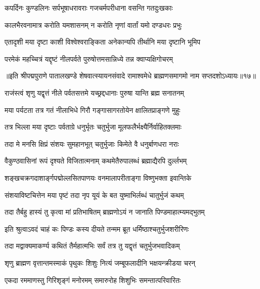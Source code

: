 \twolineshloka
{कपर्दिनः कुण्डलिनः सर्पभूषाधरावराः}
{गजचर्मपरीधाना वसन्ति गतदुःखकाः}%

\twolineshloka
{कालभैरवनामात्र करोति यमशासनम्}
{न करोति नृणां वार्तां यमो दण्डधरः प्रभुः}%

\twolineshloka
{एतादृशी मया दृष्टा काशी विश्वेश्वराङ्किता}
{अनेकान्यपि तीर्थानि मया दृष्टानि भूमिप}%

\twolineshloka
{परमेकं महच्चित्रं यद्दृष्टं नीलपर्वते}
{पुरुषोत्तमसान्निध्ये तन्न क्वाप्यक्षिगोचरम्}%

{॥इति श्रीपद्मपुराणे पातालखण्डे शेषवात्स्यायनसंवादे रामाश्वमेधे ब्राह्मणसमागमो नाम सप्तदशोऽध्यायः॥१७॥}

\resetShloka


\twolineshloka
{राजंस्त्वं शृणु यद्वृत्तं नीले पर्वतसत्तमे}
{यच्छ्रद्दधानाः पुरुषा यान्ति ब्रह्म सनातनम्}%

\twolineshloka
{मया पर्यटता तत्र गतं नीलाभिधे गिरौ}
{गङ्गासागरतोयेन क्षालितप्राङ्गणे मुहुः}%

\twolineshloka
{तत्र भिल्ला मया दृष्टाः पर्वताग्रे धनुर्भृतः}
{चतुर्भुजा मूलफलैर्भक्ष्यैर्निर्वाहितक्लमाः}%

\twolineshloka
{तदा मे मनसि क्षिप्रं संशयः सुमहानभूत्}
{चतुर्भुजाः किमेते वै धनुर्बाणधरा नराः}%

\twolineshloka
{वैकुण्ठवासिनां रूपं दृश्यते विजितात्मनाम्}
{कथमेतैरुपालब्धं ब्रह्माद्यैरपि दुर्ल्लभम्}%

\twolineshloka
{शङ्खचक्रगदाशार्ङ्गपद्मोल्लसितपाणयः}
{वनमालापरीताङ्गा विष्णुभक्ता इवान्तिके}%

\twolineshloka
{संशयाविष्टचित्तेन मया पृष्टं तदा नृप}
{यूयं के बत युष्माभिर्लब्धं चातुर्भुजं कथम्}%

\twolineshloka
{तदा तैर्बहु हास्यं तु कृत्वा मां प्रतिभाषितम्}
{ब्राह्मणोऽयं न जानाति पिण्डमाहात्म्यमद्भुतम्}%

\twolineshloka
{इति श्रुत्वाऽवदं चाहं कः पिण्डः कस्य दीयते}
{तन्मम ब्रूत धर्मिष्ठाश्चतुर्भुजशरीरिणः}%

\twolineshloka
{तदा मद्वाक्यमाकर्ण्य कथितं तैर्महात्मभिः}
{सर्वं तत्र तु यद्वृत्तं चतुर्भुजभवादिकम्}%


\twolineshloka
{शृणु ब्राह्मण वृत्तान्तमस्माकं पृथुकः शिशुः}
{नित्यं जम्बूफलादीनि भक्षयन्क्रीडया चरन्}%

\twolineshloka
{एकदा रममाणस्तु गिरिशृङ्गं मनोरमम्}
{समारुरोह शिशुभिः समन्तात्परिवारितः}%

